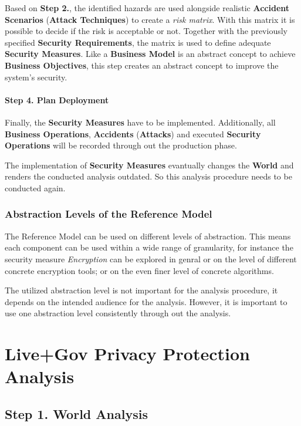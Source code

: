 Based on \textbf{Step 2.}, the identified hazards are used alongside
realistic \textbf{Accident Scenarios} (\textbf{Attack Techniques}) to
create a \emph{risk matrix}. With this matrix it is possible to decide
if the risk is acceptable or not. Together with the previously specified
\textbf{Security Requirements}, the matrix is used to define adequate
\textbf{Security Measures}. Like a \textbf{Business Model} is an
abstract concept to achieve \textbf{Business Objectives}, this step
creates an abstract concept to improve the system's security.

\paragraph{Step 4. Plan Deployment}

Finally, the \textbf{Security Measures} have to be implemented.
Additionally, all \textbf{Business Operations}, \textbf{Accidents}
(\textbf{Attacks}) and executed \textbf{Security Operations} will be
recorded through out the production phase.

The implementation of \textbf{Security Measures} evantually changes the
\textbf{World} and renders the conducted analysis outdated. So this
analysis procedure needs to be conducted again.

\subsubsection{Abstraction Levels of the Reference Model}

The Reference Model can be used on different levels of abstraction. This
means each component can be used within a wide range of granularity, for
instance the security measure \emph{Encryption} can be explored in
genral or on the level of different concrete encryption tools; or on the
even finer level of concrete algorithms.

The utilized abstraction level is not important for the analysis
procedure, it depends on the intended audience for the analysis.
However, it is important to use one abstraction level consistently
through out the analysis.

\section{Live+Gov Privacy Protection Analysis}

\subsection{Step 1. World Analysis}

